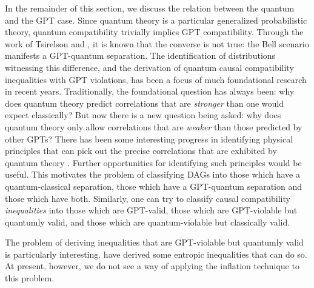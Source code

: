 \documentclass[aps,english,superscriptaddress,onecolumn,twoside,longbibliography,pra,floatfix,fleqn,nofootinbib]{revtex4-1}%
\theoremstyle{definition}
\begin{document}
In the remainder of this section, we discuss the relation between the quantum and the GPT case. Since quantum theory is a particular generalized probabilistic theory, quantum compatibility trivially implies GPT compatibility. Through the work of Tsirelson \cite{Tsirelson1980} and \citet{PROriginal}, it is known that the converse is not true: the Bell scenario manifests a GPT-quantum separation.  The identification of distributions witnessing this difference, and the derivation of quantum causal compatibility inequalities with GPT violations, has been a focus of much foundational research in recent years. Traditionally, the foundational question has always been: why does quantum theory predict correlations that are {\em stronger} than one would expect classically?  But now there is a new question being asked: why does quantum theory only allow correlations that are {\em weaker} than those predicted by other GPTs?  There has been some interesting progress in identifying physical principles that can pick out the precise correlations that are exhibited by quantum theory \cite{PopescuReviewNatureComm,ScaraniML,Rohrlich2014,InfoCausArXiv,LONatureComm,LOExploring,EPNBody,barnum2014interference,AlmostQuantum}.  Further opportunities for identifying such principles would be useful.  This motivates the problem of classifying DAGs into those which have a quantum-classical separation, those which have a GPT-quantum separation and those which have both. Similarly, one can try to classify causal compatibility \emph{inequalities} into those which are GPT-valid, those which are GPT-violable but quantumly valid, and those which are quantum-violable but classically valid. 

The problem of deriving inequalities that are GPT-violable but quantumly valid is particularly interesting.  
\citet{Chaves2015infoquantum} have derived some entropic inequalities that can do so.  At present, however, we do not see a way of applying the inflation technique to this problem. 
\end{document}
